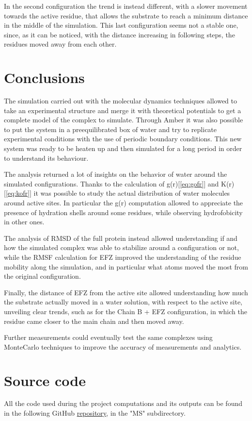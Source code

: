 \documentclass[12pt]{article}
\begin{document}
In the second configuration the trend is instead different, with a slower movement towards the active residue, that allows the substrate to reach a minimum distance in the middle of the simulation. This last configuration seems not a stable one, since, as it can be noticed, with the distance increasing in following steps, the residues moved away from each other.

\section{Conclusions}
The simulation carried out with the molecular dynamics techniques allowed to take an  experimental structure and merge it with theoretical potentials to get a complete model of the complex to simulate. Through Amber\cite{Amber} it was also possible to put the system in a preequilibrated box of water and try to replicate experimental conditions with the use of periodic boundary conditions. This new system was ready to be heaten up and then simulated for a long period in order to understand its behaviour.

The analysis returned a lot of insights on the behavior of water around the simulated configurations. Thanks to the calculation of g(r)[\ref{eq:gofr}] and K(r)[\ref{eq:kofr}] it was possible to study the actual distribution of water molecules around active sites. In particular the g(r) computation allowed to appreciate the presence of hydration shells around some residues, while observing hydrofobicity in other ones. 

The analysis of RMSD of the full protein instead allowed understanding if and how the simulated complex was able to stabilize around a configuration or not, while the RMSF calculation for EFZ improved the understanding of the residue mobility along the simulation, and in particular what atoms moved the most from the original configuration.

Finally, the distance of EFZ from the active site allowed understanding how much the substrate actually moved in a water solution, with respect to the active site, unveiling clear trends, such as for the Chain B + EFZ configuration, in which the residue came closer to the main chain and then moved away. 

Further measurements could eventually test the same complexes using MonteCarlo techniques to improve the accuracy of measurements and analytics.
\section{Source code}
All the code used during the project computations and its outputs can be found in the following GitHub \href{https://github.com/Confizolo/PoDProjects}{repository}, in the "MS" subdirectory.
\pagebreak
\end{document}
